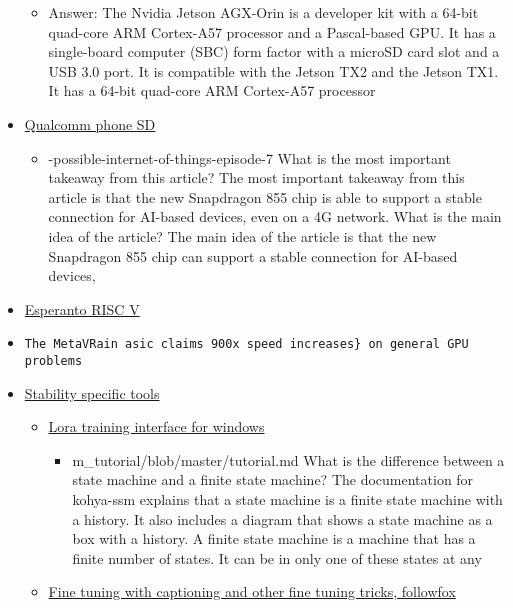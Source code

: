\begin{itemize}
  \begin{itemize}
  
  \item
    Answer: The Nvidia Jetson AGX-Orin is a developer kit with a 64-bit
    quad-core ARM Cortex-A57 processor and a Pascal-based GPU. It has a
    single-board computer (SBC) form factor with a microSD card slot and
    a USB 3.0 port. It is compatible with the Jetson TX2 and the Jetson
    TX1. It has a 64-bit quad-core ARM Cortex-A57 processor
  \end{itemize}
\item
  \href{https://www.theverge.com/2023/2/23/23611668/ai-image-stable-diffusion-mobile-android-qualcomm-fastest}{Qualcomm
  phone SD}

  \begin{itemize}
  
  \item
    -possible-internet-of-things-episode-7 What is the most important
    takeaway from this article? The most important takeaway from this
    article is that the new Snapdragon 855 chip is able to support a
    stable connection for AI-based devices, even on a 4G network. What
    is the main idea of the article? The main idea of the article is
    that the new Snapdragon 855 chip can support a stable connection for
    AI-based devices,
  \end{itemize}
\item
  \href{https://www.esperanto.ai/}{Esperanto RISC V}
\item
  \href{https://hdh4797.wixsite.com/dhan/project-1}{}

\begin{verbatim}
The MetaVRain asic claims 900x speed increases} on general GPU problems
\end{verbatim}
\item
  \href{https://sdtools.org/}{Stability specific tools}

  \begin{itemize}
  \item
    \href{https://github.com/bmaltais/kohya_ss}{Lora training interface
    for windows}

    \begin{itemize}
    
    \item
      m\_tutorial/blob/master/tutorial.md What is the difference between
      a state machine and a finite state machine? The documentation for
      kohya-ssm explains that a state machine is a finite state machine
      with a history. It also includes a diagram that shows a state
      machine as a box with a history. A finite state machine is a
      machine that has a finite number of states. It can be in only one
      of these states at any
    \end{itemize}
  \item
    \href{https://substack.com/profile/110613456-followfoxai}{Fine
    tuning with captioning and other fine tuning tricks, followfox}


\end{itemize}
\end{itemize}
